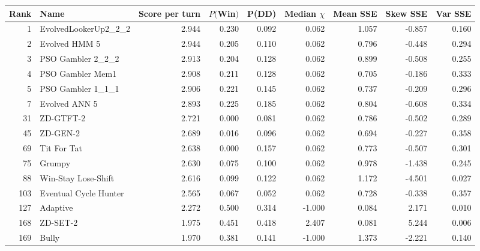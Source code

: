 \begin{tabular}{rlrrrrrrr}
\toprule
 Rank &                  Name &  Score per turn &  $P($Win$)$ &  P(DD) &  Median $\chi$ &  Mean SSE &  Skew SSE &  Var SSE \\
\midrule
    1 &  EvolvedLookerUp2\_2\_2 &           2.944 &       0.230 &  0.092 &          0.062 &     1.057 &    -0.857 &    0.160 \\
    2 &         Evolved HMM 5 &           2.944 &       0.205 &  0.110 &          0.062 &     0.796 &    -0.448 &    0.294 \\
    3 &     PSO Gambler 2\_2\_2 &           2.913 &       0.204 &  0.128 &          0.062 &     0.899 &    -0.508 &    0.255 \\
    4 &      PSO Gambler Mem1 &           2.908 &       0.211 &  0.128 &          0.062 &     0.705 &    -0.186 &    0.333 \\
    5 &     PSO Gambler 1\_1\_1 &           2.906 &       0.221 &  0.145 &          0.062 &     0.737 &    -0.209 &    0.296 \\
    7 &         Evolved ANN 5 &           2.893 &       0.225 &  0.185 &          0.062 &     0.804 &    -0.608 &    0.334 \\
   31 &             ZD-GTFT-2 &           2.721 &       0.000 &  0.081 &          0.062 &     0.786 &    -0.502 &    0.289 \\
   45 &              ZD-GEN-2 &           2.689 &       0.016 &  0.096 &          0.062 &     0.694 &    -0.227 &    0.358 \\
   69 &           Tit For Tat &           2.638 &       0.000 &  0.157 &          0.062 &     0.773 &    -0.507 &    0.301 \\
   75 &                Grumpy &           2.630 &       0.075 &  0.100 &          0.062 &     0.978 &    -1.438 &    0.245 \\
   88 &   Win-Stay Lose-Shift &           2.616 &       0.099 &  0.122 &          0.062 &     1.172 &    -4.501 &    0.027 \\
  103 & Eventual Cycle Hunter &           2.565 &       0.067 &  0.052 &          0.062 &     0.728 &    -0.338 &    0.357 \\
  127 &              Adaptive &           2.272 &       0.500 &  0.314 &         -1.000 &     0.084 &     2.171 &    0.010 \\
  168 &              ZD-SET-2 &           1.975 &       0.451 &  0.418 &          2.407 &     0.081 &     5.244 &    0.006 \\
  169 &                 Bully &           1.970 &       0.381 &  0.141 &         -1.000 &     1.373 &    -2.221 &    0.140 \\

\end{tabular}
